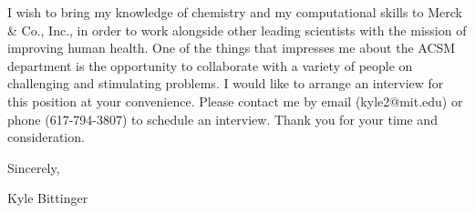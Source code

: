 \documentclass[12pt]{article}
\begin{document}
I wish to bring my knowledge of chemistry and my computational skills
to Merck \& Co., Inc., in order to work alongside other leading
scientists with the mission of improving human health.
One of the things that impresses me about the ACSM department is the
opportunity to collaborate with a variety of people on challenging and
stimulating problems.
I would like to arrange an interview for this position at your
convenience.
Please contact me by email (kyle2@mit.edu) or phone (617-794-3807) to
schedule an interview.  Thank you for your time and consideration.

Sincerely,

\vspace{5mm}

Kyle Bittinger
\end{document}
